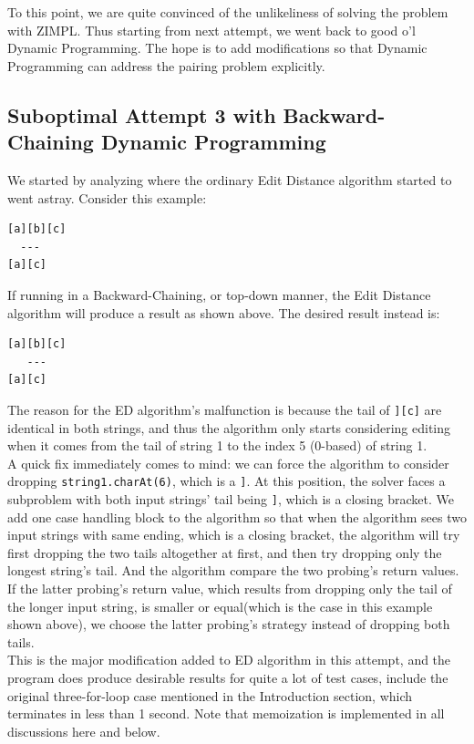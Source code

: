 \documentclass{article}
\begin{document}
To this point, we are quite convinced of the unlikeliness of solving the problem with ZIMPL. Thus starting from next attempt, we went back to good o'l Dynamic Programming. The hope is to add modifications so that Dynamic Programming can address the pairing problem explicitly.

\subsection{Suboptimal Attempt 3 with Backward-Chaining Dynamic Programming}
We started by analyzing where the ordinary Edit Distance algorithm started to went astray. Consider this example:
\begin{lstlisting}
[a][b][c]
  ---
[a][c]
\end{lstlisting}
If running in a Backward-Chaining, or top-down manner, the Edit Distance algorithm will produce a result as shown above. The desired result instead is:
\begin{lstlisting}
[a][b][c]
   ---
[a][c]
\end{lstlisting}
The reason for the ED algorithm's malfunction is because the tail of \texttt{][c]} are identical in both strings, and thus the algorithm only starts considering editing when it comes from the tail of string 1 to the index 5 (0-based) of string 1.\\

A quick fix immediately comes to mind: we can force the algorithm to consider dropping \texttt{string1.charAt(6)}, which is a \texttt{]}. At this position, the solver faces a subproblem with both input strings' tail being \texttt{]}, which is a closing bracket. We add one case handling block to the algorithm so that when the algorithm sees two input strings with same ending, which is a closing bracket, the algorithm will try first dropping the two tails altogether at first, and then try dropping only the longest string's tail. And the algorithm compare the two probing's return values. If the latter probing's return value, which results from dropping only the tail of the longer input string, is smaller or equal(which is the case in this example shown above), we choose the latter probing's strategy instead of dropping both tails. \\

This is the major modification added to ED algorithm in this attempt, and the program does produce desirable results for quite a lot of test cases, include the original three-for-loop case mentioned in the Introduction section, which terminates in less than 1 second. Note that memoization is implemented in all discussions here and below. \\
\end{document}
